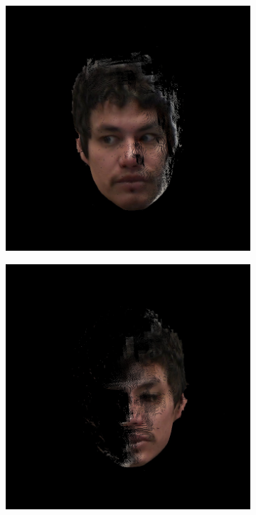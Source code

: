 \begin{figure}[h]
\begin{subfigure}[b]{0.24\textwidth}
	\end{subfigure}
	\begin{subfigure}[b]{0.24\textwidth}
		\includegraphics[width=1.1\linewidth]{./img/eyeimages/f2.jpg}
	\end{subfigure}
	\begin{subfigure}[b]{0.24\textwidth}
		\includegraphics[width=1.1\linewidth]{./img/eyeimages/f3.jpg}

\end{subfigure}
\end{figure}
